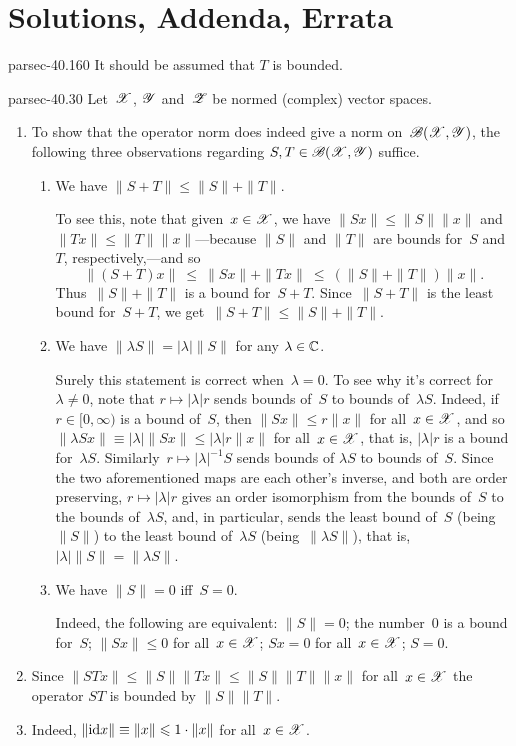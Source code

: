 \documentclass[b5page]{book}
\begin{document}
\appendix
\chapter{Solutions, Addenda, Errata}
\begin{erratum}{parsec-40.160}%
    It should be assumed that $T$ is bounded.
\end{erratum}
\begin{solution}{parsec-40.30}%
Let~$\mathscr{X}$, $\mathscr{Y}$ and~$\mathscr{Z}$ be normed (complex) vector spaces.
\begin{enumerate}
\item
To show that the operator norm does indeed
give a norm on~$\mathscr{B}(\mathscr{X},\mathscr{Y})$,
the following
three observations
regarding $S,T\in\mathscr{B}(\mathscr{X},\mathscr{Y})$
suffice.
\begin{enumerate}
\item
We have $\|S+T\|\leq \|S\|+\|T\|$.

To see this,
note that
given~$x\in \mathscr{X}$,
we have $\|Sx\|\leq \|S\|\|x\|$
and $\|Tx\|\leq \|T\|\|x\|$---because $\|S\|$ and $\|T\|$ are bounds
for~$S$ and~$T$, respectively,---and so 
\begin{equation*}
    \|(S+T)x\|
\ \leq\  \|Sx\|+\|Tx\|
\ \leq\  (\|S\|+\|T\|)\|x\|.
\end{equation*}
Thus~$\|S\|+\|T\|$ is a bound for~$S+T$.
Since~$\|S+T\|$ is the least bound for~$S+T$,
we get~$\|S+T\|\leq \|S\|+\|T\|$.

\item
We have
$\|\lambda S\|=\left|\lambda \right| \|S\|$
for any $\lambda \in \mathbb{C}$.

Surely this statement is correct when~$\lambda= 0$.
To see why it's correct for~$\lambda \neq 0$,
note that
$r\mapsto \left|\lambda\right| r$
sends bounds of~$S$ to bounds of~$\lambda S$.
Indeed,
if~$r\in[0,\infty)$ is a bound of~$S$,
then $\|Sx\|\leq r\|x\|$
for all~$x\in \mathscr{X}$,
and so~$\|\lambda Sx\| \equiv 
\left|\lambda \right|\|Sx\|\leq \left|\lambda\right| r \|x\|$
for all~$x\in\mathscr{X}$,
that is, $\left|\lambda\right|r$
is a bound for~$\lambda S$.
Similarly~$r\mapsto \left|\lambda\right|^{-1} S$
sends bounds of $\lambda S$
to bounds of~$S$.
Since the two aforementioned maps are each other's inverse,
and both are order preserving,
$r\mapsto \left|\lambda \right|r$
gives an order isomorphism from 
the bounds of~$S$ to the bounds of~$\lambda S$,
and, in particular,
    sends the least bound of~$S$ (being $\|S\|$)
to the least bound of~$\lambda S$
        (being~$\|\lambda S\|$),
that is,
$\left|\lambda\right|\|S\|=\|\lambda S\|$.
\item
We have $\|S\|=0$ iff~$S=0$.

Indeed, the following are equivalent:
$\|S\|=0$; the number~$0$ is a bound for~$S$;
$\|Sx\|\leq 0$ for all~$x\in\mathscr{X}$;
$Sx=0$ for all~$x\in\mathscr{X}$;
$S=0$.
\end{enumerate}
\item
Since $\|STx\|\leq \|S\| \|Tx\|
\leq \|S\|\|T\|\|x\|$
for all~$x\in \mathscr{X}$
the operator $ST$ is bounded by
$\|S\|\|T\|$.
\item
Indeed, $ \|\mathrm{id} x \|\equiv \|x\|\leqslant  1\cdot\|x\|$
for all~$x\in\mathscr{X}$.
\end{enumerate}
\end{solution}
\end{document}
